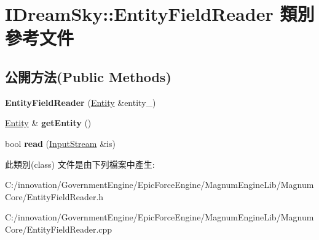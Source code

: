 \hypertarget{class_i_dream_sky_1_1_entity_field_reader}{}\section{I\+Dream\+Sky\+:\+:Entity\+Field\+Reader 類別 參考文件}
\label{class_i_dream_sky_1_1_entity_field_reader}
\subsection*{公開方法(Public Methods)}
\begin{DoxyCompactItemize}
\item 
{\bfseries Entity\+Field\+Reader} (\hyperlink{class_i_dream_sky_1_1_entity}{Entity} \&entity\+\_\+)\hypertarget{class_i_dream_sky_1_1_entity_field_reader_afe2bd63c4d51080a7bac74d428a6ce87}{}\label{class_i_dream_sky_1_1_entity_field_reader_afe2bd63c4d51080a7bac74d428a6ce87}

\item 
\hyperlink{class_i_dream_sky_1_1_entity}{Entity} \& {\bfseries get\+Entity} ()\hypertarget{class_i_dream_sky_1_1_entity_field_reader_a75432dea9b7f5a36d2394bdd8ab71e90}{}\label{class_i_dream_sky_1_1_entity_field_reader_a75432dea9b7f5a36d2394bdd8ab71e90}

\item 
bool {\bfseries read} (\hyperlink{class_i_dream_sky_1_1_input_stream}{Input\+Stream} \&is)\hypertarget{class_i_dream_sky_1_1_entity_field_reader_a6762cd8a608ef7cd2065a8fc79e4ef3b}{}\label{class_i_dream_sky_1_1_entity_field_reader_a6762cd8a608ef7cd2065a8fc79e4ef3b}

\end{DoxyCompactItemize}


此類別(class) 文件是由下列檔案中產生\+:\begin{DoxyCompactItemize}
\item 
C\+:/innovation/\+Government\+Engine/\+Epic\+Force\+Engine/\+Magnum\+Engine\+Lib/\+Magnum\+Core/Entity\+Field\+Reader.\+h\item 
C\+:/innovation/\+Government\+Engine/\+Epic\+Force\+Engine/\+Magnum\+Engine\+Lib/\+Magnum\+Core/Entity\+Field\+Reader.\+cpp\end{DoxyCompactItemize}
